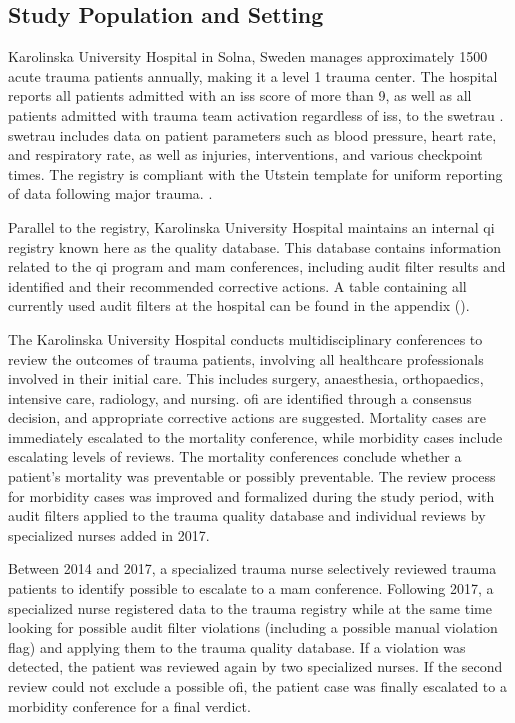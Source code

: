 \documentclass[12pt, letterpaper]{article}
\begin{document}
\subsection{Study Population and Setting}
Karolinska University Hospital in Solna, Sweden manages approximately 1500 acute trauma patients annually, making it a level 1 trauma center. The hospital reports all patients admitted with an \acrfull{iss} score of more than 9, as well as all patients admitted with trauma team activation regardless of \acrshort{iss}, to the \acrfull{swetrau} \cite{swetrau}. \acrshort{swetrau} includes data on patient parameters such as blood pressure, heart rate, and respiratory rate, as well as injuries, interventions, and various checkpoint times. The registry is compliant with the Utstein template for uniform reporting of data following major trauma. \cite{ringdal_utstein_2008}.

Parallel to the registry, Karolinska University Hospital maintains an internal \acrshort{qi} registry known here as the quality database.  This database contains information related to the \acrshort{qi} program and \acrshort{mam} conferences, including audit filter results and identified  and their recommended corrective actions. A table containing all currently used audit filters at the hospital can be found in the appendix ().

The Karolinska University Hospital conducts multidisciplinary conferences to review the outcomes of trauma patients, involving all healthcare professionals involved in their initial care. This includes surgery, anaesthesia, orthopaedics, intensive care, radiology, and nursing. \acrshort{ofi} are identified through a consensus decision, and appropriate corrective actions are suggested. Mortality cases are immediately escalated to the mortality conference, while morbidity cases include escalating levels of reviews. The mortality conferences conclude whether a patient's mortality was preventable or possibly preventable. The review process for morbidity cases was improved and formalized during the study period, with audit filters applied to the trauma quality database and individual reviews by specialized nurses added in 2017.

Between 2014 and 2017, a specialized trauma nurse selectively reviewed trauma patients to identify possible  to escalate to a \acrshort{mam} conference. Following 2017, a specialized nurse registered data to the trauma registry while at the same time looking for possible audit filter violations (including a possible manual violation flag) and applying them to the trauma quality database. If a violation was detected, the patient was reviewed again by two specialized nurses. If the second review could not exclude a possible \acrshort{ofi}, the patient case was finally escalated to a morbidity conference for a final verdict.
\end{document}

